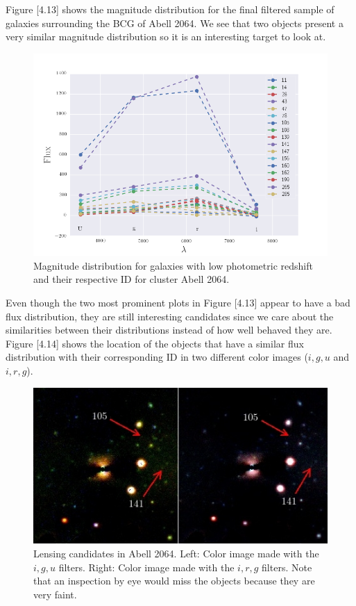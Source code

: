 Figure [4.13] shows the magnitude distribution for the final filtered sample of galaxies surrounding the BCG of Abell 2064. We see that two objects present a very similar magnitude distribution so it is an interesting target to look at. 

\begin{figure}[H]
\centering
\includegraphics[width=15cm]{images/magnitude_distribution_A2064.png}
\caption[Magnitude distribution of galaxies in Abell 2064]{Magnitude distribution for galaxies with low photometric redshift and their respective ID for cluster Abell 2064.}
\end{figure}

Even though the two most prominent plots in Figure [4.13] appear to have a bad flux distribution, they are still interesting candidates since we care about the similarities between their distributions instead of how well behaved they are. Figure [4.14] shows the location of the objects that have a similar flux distribution with their corresponding ID in two different color images ($i,g,u$ and $i,r,g$).

\begin{figure}[H]
\centering
\includegraphics[width=15cm]{images/candidates.jpg}
\caption[Lensing candidates Abell 2064]{Lensing candidates in Abell 2064. Left: Color image made with the $i,g,u$ filters. Right: Color image made with the $i,r,g$ filters. Note that an inspection by eye would miss the objects because they are very faint.}
\end{figure}

